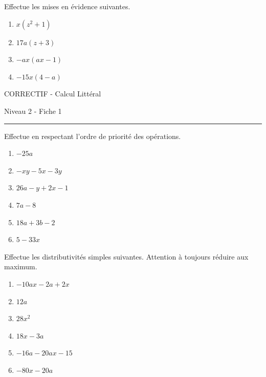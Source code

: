 \documentclass[12pt,parskip=half-, twoside=semi]{scrartcl}
\begin{document}
\begin{exercise}Effectue les mises en évidence suivantes.
  \begin{enumerate}[cols=2]
    \item $x(z^2+1)$
    \item $17a(z+3)$
    \item $-ax(ax-1)$
    \item $-15x(4-a)$
  \end{enumerate}
\end{exercise}



\begin{center}
  \bfseries
  \begin{Huge}
    CORRECTIF - Calcul Littéral
  \end{Huge}
  \smallbreak
  \begin{large}
    Niveau 2  - Fiche 1
  \end{large}
  \smallbreak
  \rule[10pt]{.5\linewidth}{1 pt}
\end{center}

\setcounter{exercise}{0}

\begin{exercise}Effectue en respectant l'ordre de priorité des opérations.
  \begin{enumerate}[cols=2]
    \item $-25a$
    \item $-xy-5x-3y$
    \item $26a-y+2x-1$
    \item $7a-8$
    \item $18a+3b-2$
    \item $5-33x$
  \end{enumerate}
\end{exercise}

\begin{exercise}Effectue les distributivités simples suivantes. Attention à toujours réduire aux maximum.
  \begin{enumerate}[cols=2]
    \item $-10ax-2a+2x$
    \item $12a$
    \item $28x^2$
    \item $18x-3a$
    \item $-16a-20ax-15$
    \item $-80x-20a$
  \end{enumerate}
\end{exercise}
\end{document}
